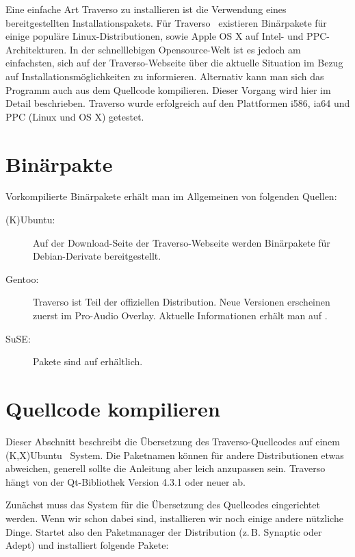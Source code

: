Eine einfache Art Traverso zu installieren ist die Verwendung eines bereitgestellten Installationspakets. Für Traverso \Version\ existieren Binärpakete für einige populäre Linux-Distributionen, sowie Apple OS X auf Intel- und PPC-Architekturen. In der schnelllebigen Opensource-Welt ist es jedoch am einfachsten, sich auf der Traverso-Webseite \cite{trav-hp} über die aktuelle Situation im Bezug auf Installationsmöglichkeiten zu informieren. Alternativ kann man sich das Programm auch aus dem Quellcode kompilieren. Dieser Vorgang wird hier im Detail beschrieben. Traverso wurde erfolgreich auf den Plattformen i586, ia64 und PPC (Linux und OS X) getestet.

\section{Binärpakte}
Vorkompilierte Binärpakete erhält man im Allgemeinen von folgenden Quellen:

\begin{description}
	\item [(K)Ubuntu:] Auf der Download-Seite der Traverso-Webseite \cite{trav-hp} werden Binärpakete für Debian-Derivate bereitgestellt.
	\item [Gentoo:] Traverso ist Teil der offiziellen Distribution. Neue Versionen erscheinen zuerst im Pro-Audio Overlay. Aktuelle Informationen erhält man auf \cite{pro-audio-wiki}.
	\item [SuSE:] Pakete sind auf \cite{suse-ref} erhältlich.
\end{description}

\section{Quellcode kompilieren}
Dieser Abschnitt beschreibt die Übersetzung des Traverso-Quellcodes auf einem (K,X)Ubuntu \Ubuntu\ System. Die Paketnamen können für andere Distributionen etwas abweichen, generell sollte die Anleitung aber leich anzupassen sein. Traverso hängt von der Qt-Bibliothek Version 4.3.1 oder neuer ab.

Zunächst muss das System für die Übersetzung des Quellcodes eingerichtet werden. Wenn wir schon dabei sind, installieren wir noch einige andere nützliche Dinge. Startet also den Paketmanager der Distribution (z.\,B. Synaptic oder Adept) und installiert folgende Pakete:

